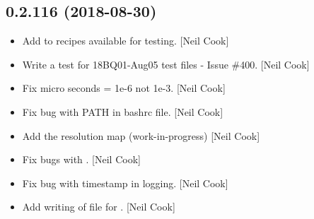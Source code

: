 \documentclass[a4paper,10pt,english]{report}
\begin{document}
\subsection{0.2.116 (2018-08-30)}
\label{\detokenize{misc/changelog:id344}}\begin{itemize}
\item {} 
Add  to recipes available for testing. {[}Neil
Cook{]}

\item {} 
Write a test for 18BQ01-Aug05 test files  - Issue
\#400. {[}Neil Cook{]}

\item {} 
Fix micro seconds = 1e-6 not 1e-3. {[}Neil Cook{]}

\item {} 
Fix bug with PATH in bashrc file. {[}Neil Cook{]}

\item {} 
Add the resolution map (work-in-progress) {[}Neil Cook{]}

\item {} 
Fix bugs with . {[}Neil Cook{]}

\item {} 
Fix bug with timestamp in logging. {[}Neil Cook{]}

\item {} 
Add writing of file for . {[}Neil Cook{]}

\end{itemize}
\end{document}
